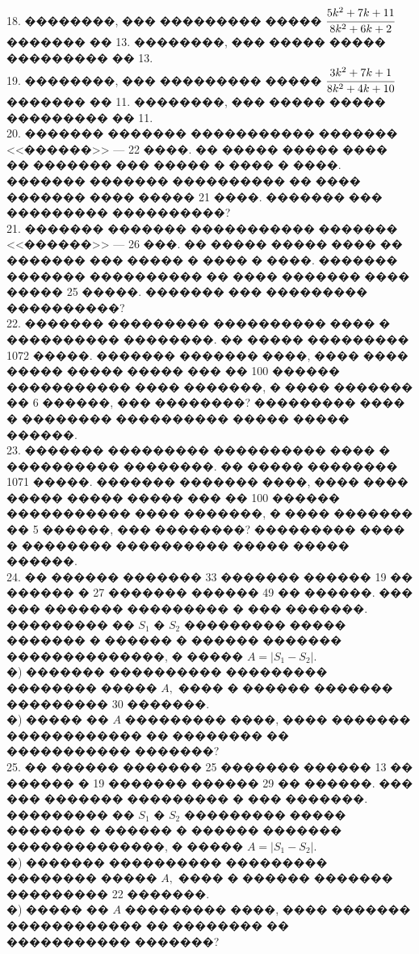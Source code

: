 \documentclass[12pt]{article}
\begin{document}
18. ��������, ��� ��������� ����� $\cfrac{5k^2+7k+11}{8k^2+6k+2}$ ������� �� 13. ��������, ��� ����� ����� ��������� �� 13.\\
19. ��������, ��� ��������� ����� $\cfrac{3k^2+7k+1}{8k^2+4k+10}$ ������� �� 11. ��������, ��� ����� ����� ��������� �� 11.\\
20. ������� ������� ����������� ������� <<������>> --- 22 ����. �� ����� ����� ���� �� ������� ��� ����� � ���� � ����. ������� ������� ���������� �� ���� ������� ���� ����� 21 ����. ������� ��� ��������� ����������?\\
21. �������  ������� ����������� ������� <<������>> --- 26 ���. �� ����� ����� ���� �� ������� ��� ����� � ���� � ����. ������� ������� ���������� �� ���� ������� ���� ����� 25 �����. ������� ��� ��������� ����������?\\
22. ������� ��������� ���������� ���� � ���������� ��������. �� ����� ��������� 1072 �����. ������� ������� ����, ���� ���� ����� ����� ����� ��� �� 100 ������ ����������� ���� �������, � ���� ������� �� 6 ������, ��� ��������? ��������� ���� � �������� ���������� ����� ����� ������.\\
23. ������� ��������� ���������� ���� � ���������� ��������. �� ����� �������� 1071 �����. ������� ������� ����, ���� ���� ����� ����� ����� ��� �� 100 ������ ����������� ���� �������, � ���� ������� �� 5 ������, ��� ��������? ��������� ���� � �������� ���������� ����� ����� ������.\\
24. �� ������ ������� 33 ������� ������ 19 �� ������ � 27 ������� ������ 49 �� ������. ��� ��� ������� ��������� � ��� �������. ��������� �� $S_1$ � $S_2$ ��������� ����� ������� � ������ � ������ ������� ��������������, � ����� $A=|S_1-S_2|.$\\
�) ������� ���������� ��������� �������� ����� $A,$ ���� � ������ ������� ��������� 30 �������.\\
�) ����� �� $A$ ��������� ����, ���� ������� ������������ �� �������� �� ����������� �������?\\
25. �� ������ ������� 25 ������� ������ 13 �� ������ � 19 ������� ������ 29 �� ������. ��� ��� ������� ��������� � ��� �������. ��������� �� $S_1$ � $S_2$ ��������� ����� ������� � ������ � ������ ������� ��������������, � ����� $A=|S_1-S_2|.$\\
�) ������� ���������� ��������� �������� ����� $A,$ ���� � ������ ������� ��������� 22 �������.\\
�) ����� �� $A$ ��������� ����, ���� ������� ������������ �� �������� �� ����������� �������?\\
\end{document}
